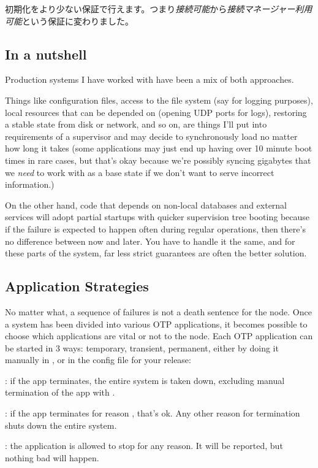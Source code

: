 初期化をより少ない保証で行えます。つまり\emph{接続可能}から\emph{接続マネージャー利用可能}という保証に変わりました。

\subsection{In a nutshell}
\label{subsec:start-link-in-a-nutshell}

Production systems I have worked with have been a mix of both approaches.

Things like configuration files, access to the file system (say for logging purposes), local resources that can be depended on (opening UDP ports for logs), restoring a stable state from disk or network, and so on, are things I'll put into requirements of a supervisor and may decide to synchronously load no matter how long it takes (some applications may just end up having over 10 minute boot times in rare cases, but that's okay because we're possibly syncing gigabytes that we \emph{need} to work with as a base state if we don't want to serve incorrect information.)

On the other hand, code that depends on non-local databases and external services will adopt partial startups with quicker supervision tree booting because if the failure is expected to happen often during regular operations,
then there's no difference between now and later. You have to handle it the same, and for these parts of the system, far less strict guarantees are often the better solution.

\subsection{Application Strategies}
\label{subsec:start-link-application-strategies}

No matter what, a sequence of failures is not a death sentence for the node. Once a system has been divided into various OTP applications, it becomes possible to choose which applications are vital or not to the node. Each OTP application can be started in 3 ways: temporary, transient, permanent, either by doing it manually in , or in the config file for your release:

\begin{itemize*}
	\item {}: if the app terminates, the entire system is taken down, excluding manual termination of the app with .
	\item {}: if the app terminates for reason , that's ok. Any other reason for termination shuts down the entire system.
	\item {}: the application is allowed to stop for any reason. It will be reported, but nothing bad will happen.
\end{itemize*}

